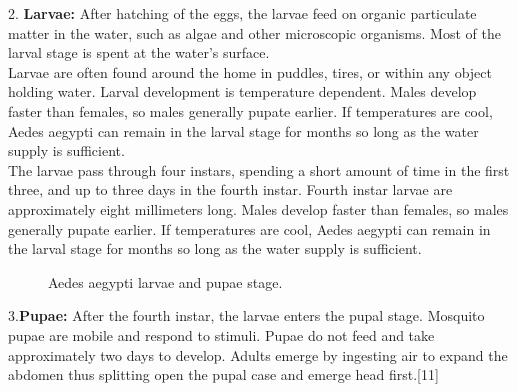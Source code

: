 \documentclass[11pt]{exam}
\begin{document}
\begin{questions}
2. \textbf{Larvae:} After hatching of the eggs, the larvae feed on organic particulate matter in the water, such as algae and other microscopic organisms. Most of the larval stage is spent at the water's surface.\\ %
Larvae are often found around the home in puddles, tires, or within any object holding water. Larval development is temperature dependent. Males develop faster than females, so males generally pupate earlier. If temperatures are cool, Aedes aegypti can remain in the larval stage for months so long as the water supply is sufficient. \\  The larvae pass through four instars, spending a short amount of time in the first three, and up to three days in the fourth instar. Fourth instar larvae are approximately eight millimeters long. 
Males develop faster than females, so males generally pupate earlier. If temperatures are cool, Aedes aegypti can remain in the larval stage for months so long as the water supply is sufficient.\\ 
\begin{figure}[H]
  \centering
    \hfill
  \caption{Aedes aegypti larvae and pupae stage.}
  \label{Ae.Aegypti life stages.}    
\end{figure} 

3.\textbf{Pupae:} After the fourth instar, the larvae enters the pupal stage. Mosquito pupae are mobile and respond to stimuli. Pupae do not feed and take approximately two days to develop. Adults emerge by ingesting air to expand the abdomen thus splitting open the pupal case and emerge head first.[11]\\


\end{questions}
\end{document}
